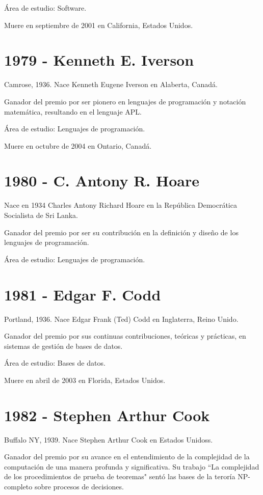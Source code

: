 \documentclass[notitlepage,letterpaper, 11pt]{article}
\begin{document}
\noindent Área de estudio: Software.

\noindent Muere en septiembre de 2001 en California, Estados Unidos.
\newline

\section*{1979 - Kenneth E. Iverson}
\noindent Camrose, 1936. Nace Kenneth Eugene Iverson en Alaberta, Canadá.

\noindent Ganador del premio por ser pionero en lenguajes de programación y notación matemática, resultando en el lenguaje APL.

\noindent Área de estudio: Lenguajes de programación.

\noindent Muere en octubre de 2004 en Ontario, Canadá.
\newline

\section*{1980 - C. Antony R. Hoare}
\noindent Nace en 1934 Charles Antony Richard Hoare en la República Democrática Socialista de Sri Lanka.

\noindent Ganador del premio por ser su contribución en la definición y diseño de los lenguajes de programación.

\noindent Área de estudio: Lenguajes de programación.
\newline

\section*{1981 - Edgar F. Codd}
\noindent Portland, 1936. Nace Edgar Frank (Ted) Codd en Inglaterra, Reino Unido.

\noindent Ganador del premio por sus continuas contribuciones, teóricas y prácticas, en sistemas de gestión de bases de datos. 

\noindent Área de estudio: Bases de datos.

\noindent Muere en abril de 2003 en Florida, Estados Unidos.
\newpage

\section*{1982 - Stephen Arthur Cook}
\noindent Buffalo NY, 1939. Nace Stephen Arthur Cook en Estados Unidoss.

\noindent Ganador del premio por su avance en el entendimiento de la complejidad de la computación de una manera profunda y significativa. Su trabajo ``La complejidad de los procedimientos de prueba de teoremas" sentó las bases de la teroría NP-completo sobre procesos de decisiones.
\end{document}
